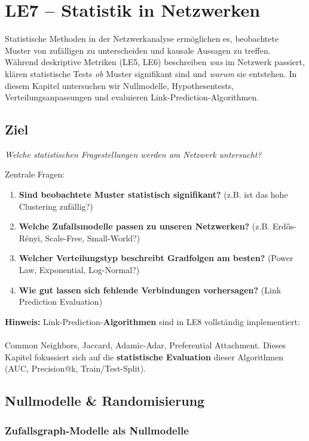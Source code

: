 \section{LE7 -- Statistik in Netzwerken}

Statistische Methoden in der Netzwerkanalyse ermöglichen es, beobachtete Muster von zufälligen zu unterscheiden und kausale Aussagen zu treffen. Während deskriptive Metriken (LE5, LE6) beschreiben \textit{was} im Netzwerk passiert, klären statistische Tests \textit{ob} Muster signifikant sind und \textit{warum} sie entstehen. In diesem Kapitel untersuchen wir Nullmodelle, Hypothesentests, Verteilungsanpassungen und evaluieren Link-Prediction-Algorithmen.

\subsection{Ziel}
\textit{Welche statistischen Fragestellungen werden am Netzwerk untersucht?}

Zentrale Fragen:
\begin{enumerate}
  \item \textbf{Sind beobachtete Muster statistisch signifikant?} (z.B. ist das hohe Clustering zufällig?)
  \item \textbf{Welche Zufallsmodelle passen zu unseren Netzwerken?} (z.B. Erdős-Rényi, Scale-Free, Small-World?)
  \item \textbf{Welcher Verteilungstyp beschreibt Gradfolgen am besten?} (Power Law, Exponential, Log-Normal?)
  \item \textbf{Wie gut lassen sich fehlende Verbindungen vorhersagen?} (Link Prediction Evaluation)
\end{enumerate}

\textbf{Hinweis:} Link-Prediction-\textbf{Algorithmen} sind in LE8 vollständig implementiert:
\\\\
Common Neighbors, Jaccard, Adamic-Adar, Preferential Attachment. Dieses Kapitel fokussiert sich auf die \textbf{statistische Evaluation} dieser Algorithmen (AUC, Precision@k, Train/Test-Split).

\subsection{Nullmodelle \& Randomisierung}

\subsubsection{Zufallsgraph-Modelle als Nullmodelle}

